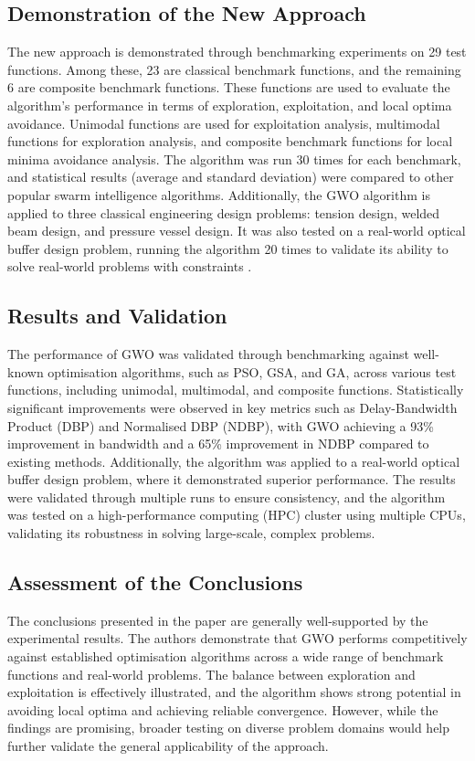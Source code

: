 \documentclass[a4paper, 12pt]{extarticle}
\begin{document}
\subsection{Demonstration of the New Approach}
The new approach is demonstrated through benchmarking experiments on 29 test functions. Among these, 23 are classical benchmark functions, and the remaining 6 are composite benchmark functions. These functions are used to evaluate the algorithm’s performance in terms of exploration, exploitation, and local optima avoidance. Unimodal functions are used for exploitation analysis, multimodal functions for exploration analysis, and composite benchmark functions for local minima avoidance analysis. The algorithm was run 30 times for each benchmark, and statistical results (average and standard deviation) were compared to other popular swarm intelligence algorithms.   Additionally, the GWO algorithm is applied to three classical engineering design problems: tension design, welded beam design, and pressure vessel design. It was also tested on a real-world optical buffer design problem, running the algorithm 20 times to validate its ability to solve real-world problems with constraints \cite{mirjalili2016multi}.

\subsection{Results and Validation}
The performance of GWO was validated through benchmarking against well-known optimisation algorithms, such as PSO, GSA, and GA, across various test functions, including unimodal, multimodal, and composite functions. Statistically significant improvements were observed in key metrics such as Delay-Bandwidth Product (DBP) and Normalised DBP (NDBP), with GWO achieving a 93\% improvement in bandwidth and a 65\% improvement in NDBP compared to existing methods. Additionally, the algorithm was applied to a real-world optical buffer design problem, where it demonstrated superior performance. The results were validated through multiple runs to ensure consistency, and the algorithm was tested on a high-performance computing (HPC) cluster using multiple CPUs, validating its robustness in solving large-scale, complex problems.

\subsection{Assessment of the Conclusions}
The conclusions presented in the paper are generally well-supported by the experimental results. The authors demonstrate that GWO performs competitively against established optimisation algorithms across a wide range of benchmark functions and real-world problems. The balance between exploration and exploitation is effectively illustrated, and the algorithm shows strong potential in avoiding local optima and achieving reliable convergence. However, while the findings are promising, broader testing on diverse problem domains would help further validate the general applicability of the approach. 
\end{document}
